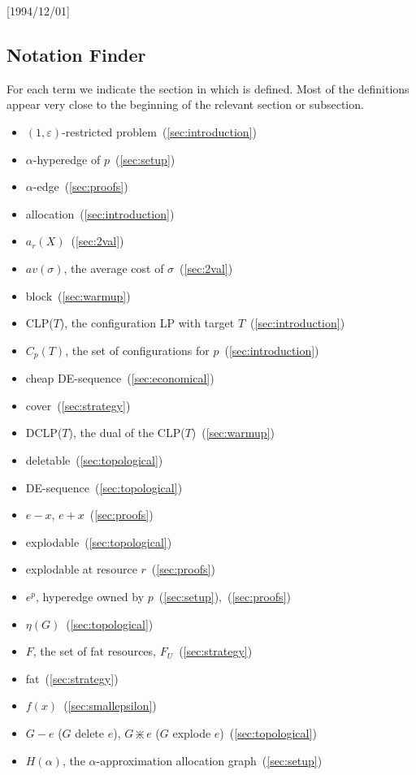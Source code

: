 \NeedsTeXFormat{LaTeX2e}[1994/12/01]\documentclass[letterpaper, 11pt]{article}
\theoremstyle{definition}
\theoremstyle{remark}
\numberwithin{equation}{section}
\newcommand{\explode}{\divideontimes}
\newcommand{\veps}{\varepsilon}
\begin{document}
\subsection{Notation Finder}

For each term we indicate the section in which is defined. Most of the definitions appear very close to the beginning of the relevant section or subsection.

\begin{itemize} 
\item $(1,\veps)$-restricted problem~(\ref{sec:introduction})
\item $\alpha$-hyperedge of $p$~(\ref{sec:setup})
\item $\alpha$-edge~(\ref{sec:proofs})
\item allocation~(\ref{sec:introduction})
\item $a_r(X)$~(\ref{sec:2val})
\item $av(\sigma)$, the average cost of $\sigma$~(\ref{sec:2val})
\item block~(\ref{sec:warmup})
\item CLP($T$), the configuration LP with target $T$~(\ref{sec:introduction})
\item $C_p(T)$, the set of configurations for $p$~(\ref{sec:introduction})
\item cheap DE-sequence~(\ref{sec:economical})
\item cover~(\ref{sec:strategy})
\item DCLP($T$), the dual of the CLP($T$)~(\ref{sec:warmup})
\item deletable~(\ref{sec:topological})
\item DE-sequence~(\ref{sec:topological})
\item $e-x$, $e+x$~(\ref{sec:proofs})
\item explodable~(\ref{sec:topological})
\item explodable at resource $r$~(\ref{sec:proofs})
\item $e^p$, hyperedge owned by $p$~(\ref{sec:setup}),~(\ref{sec:proofs}) 
\item $\eta(G)$~(\ref{sec:topological})
\item $F$, the set of fat resources, $F_U$~(\ref{sec:strategy})
\item fat~(\ref{sec:strategy})
\item $f(x)$~(\ref{sec:smallepsilon})
\item $G-e$ ($G$ delete $e$), $G\explode e$ ($G$ explode $e$)~(\ref{sec:topological})
\item $H(\alpha)$, the $\alpha$-approximation allocation graph~(\ref{sec:setup})

\end{itemize}
\end{document}
